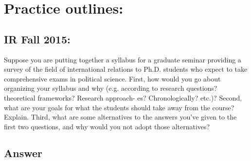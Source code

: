 \documentclass[11pt]{article}
\begin{document}
\section{Practice outlines:}
\label{sec-5}
\subsection{IR Fall 2015:}
\label{sec-5-1}
Suppose you are putting together a syllabus for a graduate seminar
providing a survey of the field of international relations to
Ph.D. students who expect to take comprehensive exams in political
science. First, how would you go about organizing your syllabus and
why (e.g. according to research questions? theoretical frameworks?
Research approach- es? Chronologically? etc.)? Second, what are your
goals for what the students should take away from the course?
Explain. Third, what are some alternatives to the answers you've given
to the first two questions, and why would you not adopt those
alternatives?

\subsection{Answer}
\label{sec-5-2}
\end{document}
